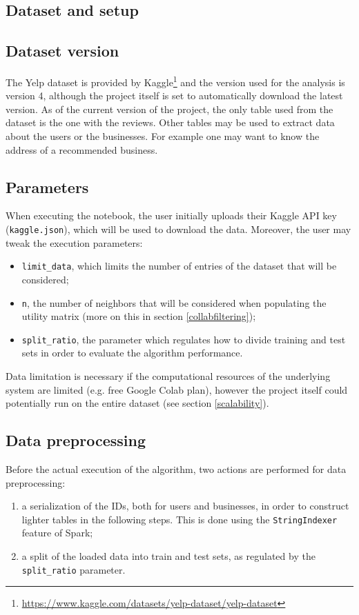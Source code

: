 \documentclass[11pt,a4paper]{article}
\newcommand{\code}{\texttt}
\begin{document}
\begin{multicols}{2}
\section{Dataset and setup}\label{setup}


\subsection{Dataset version}
The Yelp dataset is provided by Kaggle\footnote{\url{https://www.kaggle.com/datasets/yelp-dataset/yelp-dataset}} and the version used for the analysis is version 4, although the project itself is set to automatically download the latest version.
As of the current version of the project, the only table used from the dataset is the one with the reviews.
Other tables may be used to extract data about the users or the businesses.
For example one may want to know the address of a recommended business.


\subsection{Parameters}
When executing the notebook, the user initially uploads their Kaggle API key (\verb!kaggle.json!), which will be used to download the data.
Moreover, the user may tweak the execution parameters:
\begin{itemize}
	\item \code{limit\_data}, which limits the number of entries of the dataset that will be considered;
	\item \code{n}, the number of neighbors that will be considered when populating the utility matrix (more on this in section \ref{collabfiltering});
	\item \code{split\_ratio}, the parameter which regulates how to divide training and test sets in order to evaluate the algorithm performance.
\end{itemize}
Data limitation is necessary if the computational resources of the underlying system are limited (e.g. free Google Colab plan), however the project itself could potentially run on the entire dataset (see section \ref{scalability}).


\subsection{Data preprocessing}
Before the actual execution of the algorithm, two actions are performed for data preprocessing:
\begin{enumerate}
	\item a serialization of the IDs, both for users and businesses, in order to construct lighter tables in the following steps. This is done using the \code{StringIndexer} feature of Spark;
	\item a split of the loaded data into train and test sets, as regulated by the \code{split\_ratio} parameter.
\end{enumerate}




\end{multicols}
\end{document}

